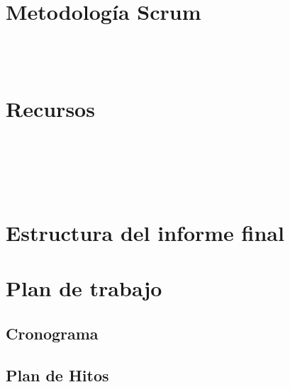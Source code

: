 \section{Metodología Scrum}

\lipsum[10] \\
\lipsum[11] \\
\lipsum[12]

\clearpage

\section{Recursos}

\lipsum[20] \\
\lipsum[21] \\
\lipsum[22] \\
\lipsum[23] \\
\lipsum[24]

\clearpage

\section{Estructura del informe final}
\clearpage

\section{Plan de trabajo}
\subsection{Cronograma}

\subsection{Plan de Hitos}

\clearpage


